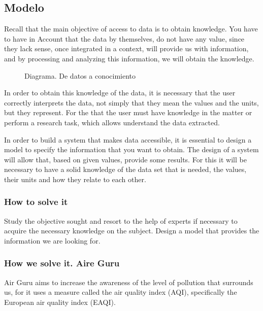 \subsection{Modelo}

Recall that the main objective of access to data is to obtain knowledge. You have to have in
Account that the data by themselves, do not have any value, since they lack sense, once integrated in a context,
will provide us with information, and by processing and analyzing this information, we will obtain the knowledge. \\
    
\begin{figure}[ht]
    \centering 
      \caption{Diagrama. De datos a conocimiento}
    \end{figure}
 
    In order to obtain this knowledge of the data, it is necessary that the user correctly interprets the data, not
    simply that they mean the values and the units, but they represent. For the
    that the user must have knowledge in the matter or perform a research task, which allows
    understand the data extracted.
    
    In order to build a system that makes data accessible, it is essential to design a model to specify the
    information that you want to obtain. The design of a system will allow that, based on given values, provide some results.
    For this it will be necessary to have a solid knowledge of the data set that is needed, the values,
    their units and how they relate to each other.


\subsubsection{How to solve it} 
Study the objective sought and resort to the help of experts if necessary to acquire the necessary knowledge
on the subject. Design a model that provides the information we are looking for.

\subsubsection{How we solve it. Aire Guru} 
Air Guru aims to increase the awareness of the level of pollution that surrounds us, for it uses a measure called
the air quality index (AQI), specifically the European air quality index (EAQI).


